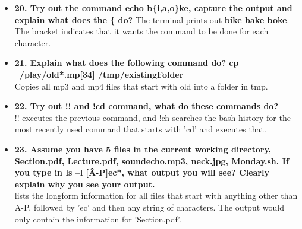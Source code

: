 \documentclass{article}
\begin{document}
\begin{itemize}
\begin{quote}
\end{quote}
\item \textbf{20. Try out the command echo b\{i,a,o\}ke,   capture the output and explain what does the \{ do?} The terminal prints out \textbf{bike bake boke}. The bracket indicates that it wants the command to be done for each character.
\item \textbf{21. Explain what does the following command do?    cp  ~/play/old*.mp[34]  /tmp/existingFolder}\\
Copies all mp3 and mp4 files that start with old into a folder in tmp.
\item \textbf{22. Try out !! and !cd command, what do these commands do?}\\
!! executes the previous command, and !ch searches the bash history for the most recently used command that starts with 'cd' and executes that.
\item \textbf{23. Assume you have 5 files in the current working directory, Section.pdf, Lecture.pdf, soundecho.mp3, neck.jpg, Monday.sh. If you type in  ls –l [\^ A-P]ec*, what output you will see? Clearly explain why you see your output.}\\
lists the longform information for all files that start with anything other than A-P, followed by 'ec' and then any string of characters. The output would only contain the information for 'Section.pdf'.
\end{itemize}
\end{document}

